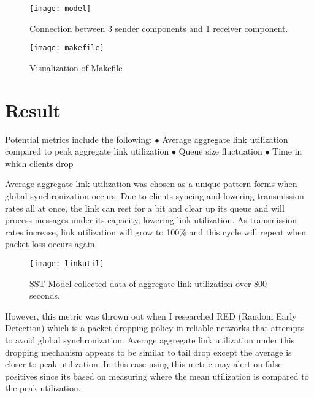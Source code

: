 \documentclass{article}
\begin{document}
\begin{figure}[H]
	\centering
	\texttt{[image: model]}
	\caption{Connection between 3 sender components and 1 receiver component.}
\end{figure}

\begin{figure}[H]
	\centering
	\texttt{[image: makefile]}
	\caption{Visualization of Makefile}
\end{figure}

\section{Result} %

Potential metrics include the following:\newline
	$\bullet$ Average aggregate link utilization compared to peak aggregate link utilization \newline
	$\bullet$ Queue size fluctuation \newline
	$\bullet$ Time in which clients drop \newline\newline

	Average aggregate link utilization was chosen as a unique pattern forms when global synchronization occurs. Due to clients syncing and lowering transmission rates all at once, the link can rest for a bit and clear up its queue and will process messages under its capacity, lowering link utilization. As transmission rates increase, link utilization will grow to 100\% and this cycle will repeat when packet loss occurs again.\newline
	
	\begin{figure}[H]
	\centering
	\texttt{[image: linkutil]}
	\caption{SST Model collected data of aggregate link utilization over 800 seconds.}
	\end{figure}
	
	\indent However, this metric was thrown out when I researched RED (Random Early Detection) which is a packet dropping policy in reliable networks that attempts to avoid global synchronization. Average aggregate link utilization under this dropping mechanism appears to be similar to tail drop except the average is closer to peak utilization. In this case using this metric may alert on false positives since its based on measuring where the mean utilization is compared to the peak utilization. \newline
	
\end{document}
